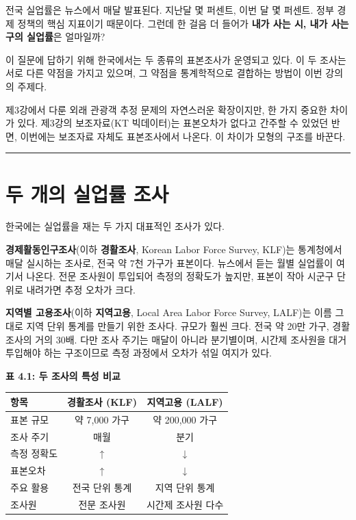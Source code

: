 \documentclass[
  letterpaper,
  DIV=11,
  numbers=noendperiod]{scrreprt}
\newcounter{none} %
\begin{document}
전국 실업률은 뉴스에서 매달 발표된다. 지난달 몇 퍼센트, 이번 달 몇
퍼센트. 정부 경제 정책의 핵심 지표이기 때문이다. 그런데 한 걸음 더
들어가 \textbf{내가 사는 시, 내가 사는 구의 실업률}은 얼마일까?

이 질문에 답하기 위해 한국에서는 두 종류의 표본조사가 운영되고 있다. 이
두 조사는 서로 다른 약점을 가지고 있으며, 그 약점을 통계학적으로
결합하는 방법이 이번 강의의 주제다.

제3강에서 다룬 외래 관광객 추정 문제의 자연스러운 확장이지만, 한 가지
중요한 차이가 있다. 제3강의 보조자료(KT 빅데이터)는 표본오차가 없다고
간주할 수 있었던 반면, 이번에는 보조자료 자체도 표본조사에서 나온다. 이
차이가 모형의 구조를 바꾼다.

\begin{center}\rule{0.5\linewidth}{0.5pt}\end{center}

\section{두 개의 실업률
조사}\label{uxb450-uxac1cuxc758-uxc2e4uxc5c5uxb960-uxc870uxc0ac}

한국에는 실업률을 재는 두 가지 대표적인 조사가 있다.

\textbf{경제활동인구조사}(이하 \textbf{경활조사}, Korean Labor Force
Survey, KLF)는 통계청에서 매달 실시하는 조사로, 전국 약 7천 가구가
표본이다. 뉴스에서 듣는 월별 실업률이 여기서 나온다. 전문 조사원이
투입되어 측정의 정확도가 높지만, 표본이 작아 시군구 단위로 내려가면 추정
오차가 크다.

\textbf{지역별 고용조사}(이하 \textbf{지역고용}, Local Area Labor Force
Survey, LALF)는 이름 그대로 지역 단위 통계를 만들기 위한 조사다. 규모가
훨씬 크다. 전국 약 20만 가구, 경활조사의 거의 30배. 다만 조사 주기는
매달이 아니라 분기별이며, 시간제 조사원을 대거 투입해야 하는 구조이므로
측정 과정에서 오차가 섞일 여지가 있다.

\textbf{표 4.1: 두 조사의 특성 비교}

{\def\LTcaptype{none} %
\begin{longtable}[]{@{}lcc@{}}
\toprule\noalign{}
항목 & 경활조사 (KLF) & 지역고용 (LALF) \\
\midrule\noalign{}
\endhead
\bottomrule\noalign{}
\endlastfoot
표본 규모 & 약 7,000 가구 & 약 200,000 가구 \\
조사 주기 & 매월 & 분기 \\
측정 정확도 & ↑ & ↓ \\
표본오차 & ↑ & ↓ \\
주요 활용 & 전국 단위 통계 & 지역 단위 통계 \\
조사원 & 전문 조사원 & 시간제 조사원 다수 \\
\end{longtable}
}
\end{document}
